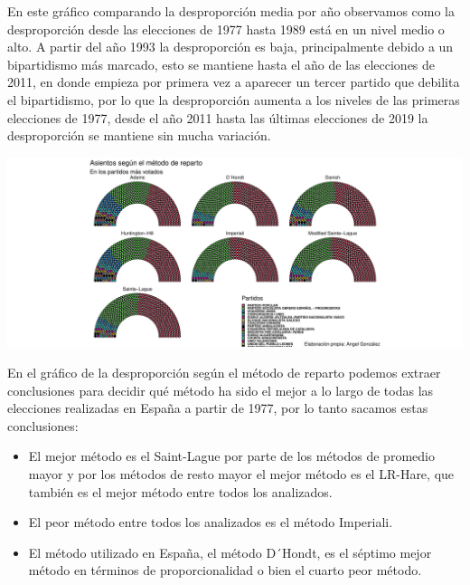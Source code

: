 \documentclass[12pt,a4paper,]{book}
\providecommand{\tightlist}{%
  \setlength{\itemsep}{0pt}\setlength{\parskip}{0pt}}
\numberwithin{dummy}{section}
\theoremstyle{ocrenumbox}
\theoremstyle{blacknumex}
\theoremstyle{blacknumbox}
\theoremstyle{ocrenum}
\theoremstyle{ocrenum}
\begin{document}
En este gráfico comparando la desproporción media por año observamos
como la desproporción desde las elecciones de 1977 hasta 1989 está en un
nivel medio o alto. A partir del año 1993 la desproporción es baja,
principalmente debido a un bipartidismo más marcado, esto se mantiene
hasta el año de las elecciones de 2011, en donde empieza por primera vez
a aparecer un tercer partido que debilita el bipartidismo, por lo que la
desproporción aumenta a los niveles de las primeras elecciones de 1977,
desde el año 2011 hasta las últimas elecciones de 2019 la desproporción
se mantiene sin mucha variación.

\begin{center}\includegraphics[width=1\linewidth]{figurasR/unnamed-chunk-123-1} \end{center}

En el gráfico de la desproporción según el método de reparto podemos
extraer conclusiones para decidir qué método ha sido el mejor a lo largo
de todas las elecciones realizadas en España a partir de 1977, por lo
tanto sacamos estas conclusiones:

\begin{itemize}
\tightlist
\item
  El mejor método es el Saint-Lague por parte de los métodos de promedio
  mayor y por los métodos de resto mayor el mejor método es el LR-Hare,
  que también es el mejor método entre todos los analizados.
\item
  El peor método entre todos los analizados es el método Imperiali.
\item
  El método utilizado en España, el método D´Hondt, es el séptimo mejor
  método en términos de proporcionalidad o bien el cuarto peor método.
\end{itemize}
\end{document}
